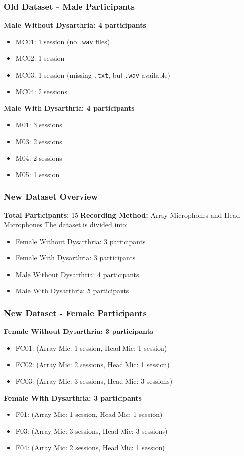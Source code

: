 \begin{frame}
    \frametitle{Old Dataset - Male Participants}
    \textbf{Male Without Dysarthria: 4 participants}
    \begin{itemize}
        \item MC01: 1 session (no \texttt{.wav} files)
        \item MC02: 1 session
        \item MC03: 1 session (missing \texttt{.txt}, but \texttt{.wav} available)
        \item MC04: 2 sessions
    \end{itemize}
    
    \textbf{Male With Dysarthria: 4 participants}
    \begin{itemize}
        \item M01: 3 sessions
        \item M03: 2 sessions
        \item M04: 2 sessions
        \item M05: 1 session
    \end{itemize}
\end{frame}


\begin{frame}
    \frametitle{New Dataset Overview}
    \textbf{Total Participants:} 15  
    \textbf{Recording Method:} Array Microphones and Head Microphones  
    The dataset is divided into:
    \begin{itemize}
        \item Female Without Dysarthria: 3 participants
        \item Female With Dysarthria: 3 participants
        \item Male Without Dysarthria: 4 participants
        \item Male With Dysarthria: 5 participants
    \end{itemize}
\end{frame}

\begin{frame}
    \frametitle{New Dataset - Female Participants}
    \textbf{Female Without Dysarthria: 3 participants}
    \begin{itemize}
        \item FC01: (Array Mic: 1 session, Head Mic: 1 session)
        \item FC02: (Array Mic: 2 sessions, Head Mic: 1 session)
        \item FC03: (Array Mic: 3 sessions, Head Mic: 3 sessions)
    \end{itemize}
    
    \textbf{Female With Dysarthria: 3 participants}
    \begin{itemize}
        \item F01: (Array Mic: 1 session, Head Mic: 1 session)
        \item F03: (Array Mic: 3 sessions, Head Mic: 3 sessions)
        \item F04: (Array Mic: 2 sessions, Head Mic: 1 session)
    \end{itemize}
\end{frame}

